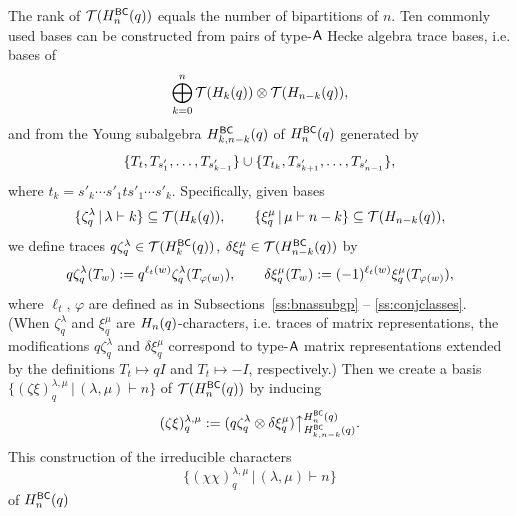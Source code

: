 \documentclass[11pt]{article}
\theoremstyle{definition}
\numberwithin{equation}{section}
\begin{document}
\label{ss:bnhbnq}

The rank of $\mathcal{T}(H_n^{\mathsf{BC}}(q))$ equals the number of bipartitions of $n$.
Ten commonly used bases
can be constructed from pairs of type-$\mathsf{A}$
Hecke algebra trace bases, i.e. bases of
\begin{equation*}
  \bigoplus_{k=0}^n \mathcal{T}(H_k(q)) \otimes \mathcal{T}(H_{n-k}(q)),
\end{equation*}
and from the Young subalgebra
$H_{k,n-k}^{\mathsf{BC}}(q)$ of $H_n^{\mathsf{BC}}(q)$ generated by
\begin{equation*}
  \{ T_{t}, T_{\smash{s'_{\smash{1}}}}, \dotsc, T_{\smash{s'_{\smash{k-1}}}} \} \cup
  \{ T_{t_k}, T_{\smash{s'_{\smash{k+1}}}}, \dotsc, T_{\smash{s'_{\smash{n-1}}}} \},
\end{equation*}
where $t_k = s'_k \cdots s'_1 t s'_1 \cdots s'_k$.
Specifically, given bases
\begin{equation}\label{eq:basispair1}
  \{ \zeta_q^\lambda \,|\, \lambda \vdash k\}
  \subseteq \trsp(H_k(q)), \qquad
  \{ \xi_q^\mu \,|\, \mu \vdash n-k\}
  \subseteq \trsp(H_{n-k}(q)),
\end{equation}
we define traces
$q\zeta_q^\lambda \in \mathcal{T}(H_{k}^{\mathsf{BC}}(q))$,
$\delta\xi_q^\mu \in \mathcal{T}(H_{n-k}^{\mathsf{BC}}(q))$ by
\begin{equation*}
  q\zeta_q^\lambda(T_w) := q^{\ell_t(w)}\zeta_q^\lambda(T_{\varphi(w)}),
  \qquad
  \delta\xi_q^\mu(T_w) := (-1)^{\ell_t(w)}\xi_q^\mu(T_{\varphi(w)}),
\end{equation*}
where $\ell_t$, $\varphi$ are defined as in
Subsections~\ref{ss:bnassubgp} -- \ref{ss:conjclasses}.
(When $\zeta^\lambda_q$ and $\xi^\mu_q$ are $H_n(q)$-characters, i.e. traces of matrix representations,
the modifications $q\zeta^\lambda_q$ and $\delta\xi^\mu_q$
correspond to
type-$\mathsf{A}$ matrix representations extended by the definitions
$T_t \mapsto qI$ and $T_t \mapsto -I$, respectively.)
Then we create a basis
$\{ (\zeta\xi)_q^{\lambda,\mu} \,|\, (\lambda,\mu) \vdash n \}$
of $\mathcal{T}(H_n^{\mathsf{BC}}(q))$ by
inducing
\begin{equation}\label{eq:inducedpair}
  (\zeta\xi)_q^{\lambda,\mu} \defeq (q\zeta_q^\lambda \otimes \delta\xi_q^\mu)
  \upparrow_{\hbq{k,n-k}}^{\hbnq}.
\end{equation}
This construction of the irreducible characters
\begin{equation*}
  \{ (\chi\chi)^{\lambda,\mu}_q \,|\, (\lambda,\mu) \vdash n \}
  \end{equation*}
of $H_n^{\mathsf{BC}}(q)$ 
\end{document}
